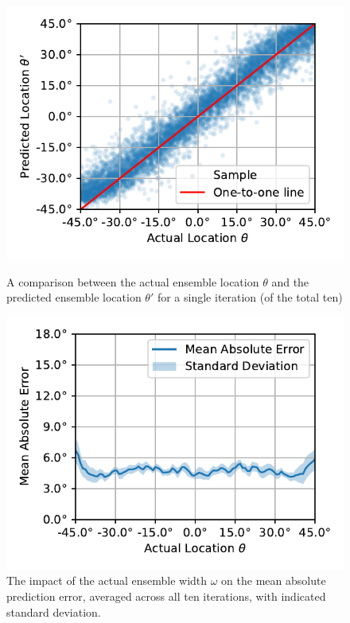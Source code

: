 \documentclass[11pt]{article}
\begin{document}
\begin{figure}[ht!]
  \centering
  \begin{minipage}[t]{0.45\linewidth}
    \includegraphics[width=\linewidth]{../figures/actual_vs_predicted_location.pdf}
    \caption{\label{fig:actual_vs_predicted_location}A comparison between the actual ensemble location $\theta$ and the predicted ensemble location $\theta'$ for a single iteration (of the total ten) }
  \end{minipage}
  \hspace{0.5cm}
  \begin{minipage}[t]{0.45\linewidth}
    \includegraphics[width=\linewidth]{../figures/mae_location.pdf}
    \caption{\label{fig:mae_location}The impact of the actual ensemble width $\omega$ on the mean absolute prediction error, averaged across all ten iterations, with indicated standard deviation.}
  \end{minipage}
\end{figure}
\end{document}

